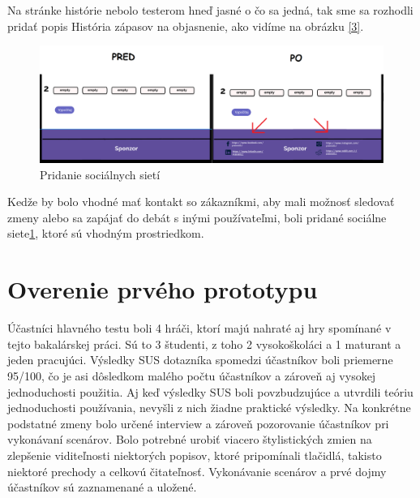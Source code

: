 Na stránke histórie nebolo testerom hneď jasné o čo sa jedná, tak sme sa rozhodli pridať popis História zápasov na objasnenie, ako vidíme na obrázku \ref{3}.
\\



\begin{figure}[h!]
	
	\includegraphics[width=.9\textwidth]{figures/4}
	
	\centering
	
	\caption{ Pridanie sociálnych sietí \label{4}}
	
\end{figure}

Kedže by bolo vhodné mať kontakt so zákazníkmi, aby mali možnosť sledovať zmeny alebo sa zapájať do debát s inými používateľmi, boli pridané sociálne siete\ref{4}, ktoré sú vhodným prostriedkom.





\section{Overenie prvého prototypu}



Účastníci hlavného testu boli 4 hráči, ktorí majú nahraté aj hry spomínané v tejto bakalárskej práci. Sú to 3 študenti, z toho 2 vysokoškoláci a 1 maturant a jeden pracujúci. Výsledky SUS dotazníka spomedzi účastníkov boli priemerne 95/100, čo je asi dôsledkom malého počtu účastníkov a zároveň aj vysokej jednoduchosti použitia. Aj keď výsledky SUS boli povzbudzujúce a utvrdili teóriu jednoduchosti používania, nevyšli z nich žiadne praktické výsledky. Na konkrétne podstatné zmeny bolo určené interview a zároveň pozorovanie účastníkov pri vykonávaní scenárov. Bolo potrebné urobiť viacero štylistických zmien na zlepšenie viditeľnosti niektorých popisov, ktoré pripomínali tlačidlá, takisto niektoré prechody a celkovú čitateľnosť. Vykonávanie scenárov a prvé dojmy účastníkov sú zaznamenané a uložené.


